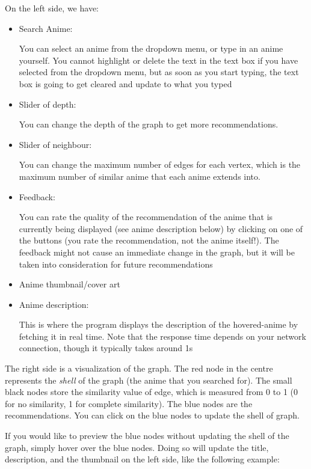 \documentclass[12pt]{article}
\begin{document}
\begin{enumerate}
\begin{text}
On the left side, we have:

\begin{itemize}
    \item Search Anime: 

    You can select an anime from the dropdown menu, or type in an anime yourself. You cannot highlight or delete the text in the text box if you have selected from the dropdown menu, but as soon as you start typing, the text box is going to get cleared and update to what you typed

    \item Slider of depth: 

    You can change the depth of the graph to get more recommendations.

    \item Slider of neighbour:

    You can change the maximum number of edges for each vertex, which is the maximum number of similar anime that each anime extends into.

    \item Feedback:

    You can rate the quality of the recommendation of the anime that is currently being displayed (see anime description below) by clicking on one of the buttons (you rate the recommendation, not the anime itself!). The feedback might not cause an immediate change in the graph, but it will be taken into consideration for future recommendations

    \item Anime thumbnail/cover art
    
    \item Anime description:

    This is where the program displays the description of the hovered-anime by fetching it in real time. Note that the response time depends on your network connection, though it typically takes around 1s
\end{itemize}

The right side is a visualization of the graph. The red node in the centre represents the \textit{shell} of the graph (the anime that you searched for). The small black nodes store the similarity value of edge, which is measured from 0 to 1 (0 for no similarity, 1 for complete similarity). The blue nodes are the recommendations. You can click on the blue nodes to update the shell of graph.

If you would like to preview the blue nodes without updating the shell of the graph, simply hover over the blue nodes. Doing so will update the title, description, and the thumbnail on the left side, like the following example:


\end{text}
\end{enumerate}
\end{document}
